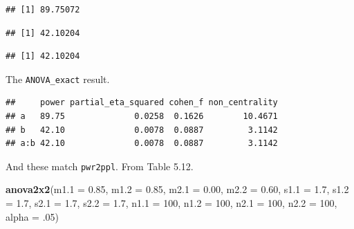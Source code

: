 \documentclass[]{book}
\newenvironment{Shaded}{\begin{snugshade}}{\end{snugshade}}
\newcommand{\DataTypeTok}[1]{\textcolor[rgb]{0.13,0.29,0.53}{#1}}
\newcommand{\DecValTok}[1]{\textcolor[rgb]{0.00,0.00,0.81}{#1}}
\newcommand{\FloatTok}[1]{\textcolor[rgb]{0.00,0.00,0.81}{#1}}
\newcommand{\KeywordTok}[1]{\textcolor[rgb]{0.13,0.29,0.53}{\textbf{#1}}}
\newcommand{\NormalTok}[1]{#1}
\newcommand{\OperatorTok}[1]{\textcolor[rgb]{0.81,0.36,0.00}{\textbf{#1}}}
\newcommand{\OtherTok}[1]{\textcolor[rgb]{0.56,0.35,0.01}{#1}}
\newcommand{\StringTok}[1]{\textcolor[rgb]{0.31,0.60,0.02}{#1}}
\begin{document}
\begin{verbatim}
## [1] 89.75072
\end{verbatim}

\begin{Shaded}
\end{Shaded}

\begin{verbatim}
## [1] 42.10204
\end{verbatim}

\begin{Shaded}
\end{Shaded}

\begin{verbatim}
## [1] 42.10204
\end{verbatim}

The \texttt{ANOVA\_exact} result.

\begin{Shaded}
\end{Shaded}

\begin{verbatim}
##     power partial_eta_squared cohen_f non_centrality
## a   89.75              0.0258  0.1626        10.4671
## b   42.10              0.0078  0.0887         3.1142
## a:b 42.10              0.0078  0.0887         3.1142
\end{verbatim}

And these match \texttt{pwr2ppl}. From Table 5.12.

\begin{Shaded}
\begin{Highlighting}[]
\KeywordTok{anova2x2}\NormalTok{(}\DataTypeTok{m1.1 =} \FloatTok{0.85}\NormalTok{, }\DataTypeTok{m1.2 =} \FloatTok{0.85}\NormalTok{, }\DataTypeTok{m2.1 =} \FloatTok{0.00}\NormalTok{, }\DataTypeTok{m2.2 =} \FloatTok{0.60}\NormalTok{,}
         \DataTypeTok{s1.1 =} \FloatTok{1.7}\NormalTok{, }\DataTypeTok{s1.2 =} \FloatTok{1.7}\NormalTok{, }\DataTypeTok{s2.1 =} \FloatTok{1.7}\NormalTok{, }\DataTypeTok{s2.2 =} \FloatTok{1.7}\NormalTok{,}
         \DataTypeTok{n1.1 =} \DecValTok{100}\NormalTok{, }\DataTypeTok{n1.2 =} \DecValTok{100}\NormalTok{, }\DataTypeTok{n2.1 =} \DecValTok{100}\NormalTok{, }\DataTypeTok{n2.2 =} \DecValTok{100}\NormalTok{,}
         \DataTypeTok{alpha =} \FloatTok{.05}\NormalTok{)}
\end{Highlighting}
\end{Shaded}
\end{document}
